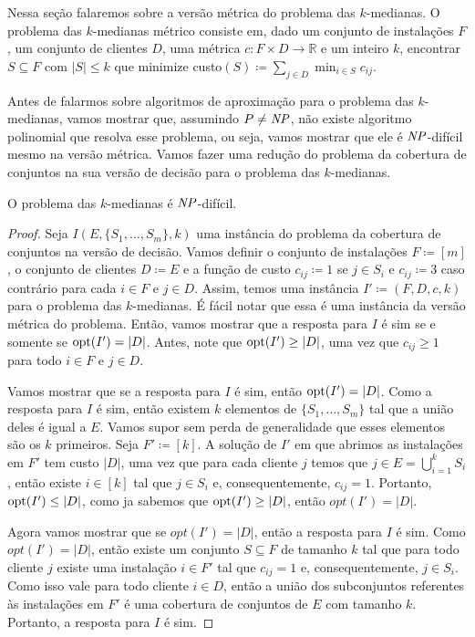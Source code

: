 Nessa seção falaremos sobre a versão métrica do problema das $k$-medianas. 
O problema das $k$-medianas métrico consiste em, dado um conjunto de instalações $F$, um conjunto de clientes $D$, uma métrica $c : F \times D \rightarrow \mathbb{R}$ e um inteiro $k$, encontrar $S \subseteq F$ com $|S| \leq k$ que minimize custo$(S) \coloneqq \sum_{j \in D} \min_{i \in S} c_{ij}$.

Antes de falarmos sobre algoritmos de aproximação para o problema das $k$-medianas, vamos mostrar que, assumindo $P \neq \mathit{NP}$, não existe algoritmo polinomial que resolva esse problema, ou seja, vamos mostrar que ele é $\mathit{NP}$-difícil mesmo na versão métrica. Vamos fazer uma redução do problema da cobertura de conjuntos na sua versão de decisão para o problema das $k$-medianas.

\begin{theorem}
O problema das $k$-medianas é $\mathit{NP}$-difícil.
\end{theorem}
\begin{proof}
Seja $I(E,\{S_1,\ldots,S_m\},k)$ uma instância do problema da cobertura de conjuntos na versão de decisão. Vamos definir o conjunto de instalações $F \coloneqq [m]$, o conjunto de clientes $D \coloneqq E$ e a função de custo $c_{ij} \coloneqq 1$ se $j \in S_i$ e $c_{ij} \coloneqq 3$ caso contrário para cada $i \in F$ e $j \in D$. Assim, temos uma instância $I' \coloneqq (F,D,c,k)$ para o problema das $k$-medianas. É fácil notar que essa é uma instância da versão métrica do problema. Então, vamos mostrar que a resposta para $I$ é sim se e somente se $\mathrm{opt}(I') = |D|$. Antes, note que $\mathrm{opt}(I') \geq |D|$, uma vez que $c_{ij} \geq 1$ para todo $i \in F$ e $j\in D$.

Vamos mostrar que se a resposta para $I$ é sim, então $\mathrm{opt}(I') = |D|$. Como a resposta para $I$ é sim, então existem $k$ elementos de $\{S_1,\ldots,S_m\}$ tal que a união deles é igual a $E$. Vamos supor sem perda de generalidade que esses elementos são os $k$ primeiros. Seja $F' \coloneqq [k]$. A solução de $I'$ em que abrimos as instalações em $F'$ tem custo $|D|$, uma vez que para cada cliente $j$ temos que $j \in E = \bigcup_{i= 1}^k S_i$, então existe $i \in [k]$ tal que $j \in S_i$ e, consequentemente, $c_{ij} = 1$. Portanto, $\mathrm{opt}(I') \leq |D|$, como ja sabemos que $\mathrm{opt}(I') \geq |D|$, então $opt(I') = |D|$.

Agora vamos mostrar que se $opt(I') = |D|$, então a resposta para $I$ é sim. Como $opt(I') = |D|$, então existe um conjunto $S \subseteq F$ de tamanho $k$ tal que para todo cliente $j$ existe uma instalação $i \in F'$ tal que $c_{ij} = 1$ e, consequentemente, $j \in S_i$. Como isso vale para todo cliente $i \in D$, então a união dos subconjuntos referentes às instalações em $F'$ é uma cobertura de conjuntos de $E$ com tamanho $k$. Portanto, a resposta para $I$ é sim.
\end{proof}